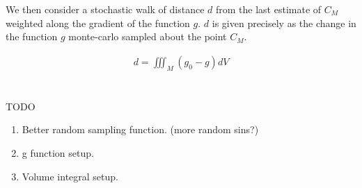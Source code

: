 \documentclass[]{article}
\begin{document}
We then consider a stochastic walk of distance $d$ from the last estimate of $C_M$ weighted along the gradient of the function $g$. $d$ is given precisely as the change in the function $g$ monte-carlo sampled about the point $C_M$.

\begin{gather}
d = \iiint_M (g_0 - g)dV
\end{gather}


\section{}
TODO

\begin{enumerate}
	\item{Better random sampling function. (more random sins?)}
	\item{g function setup.}
	\item{Volume integral setup.}
\end{enumerate}



\end{document}
